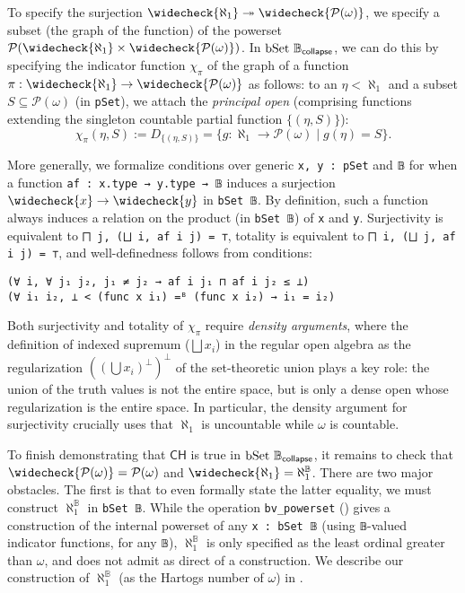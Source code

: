 \documentclass[sigplan,10pt,review]{acmart}
\newcommand{\lil}{\lstinline}
\newcommand{\CH}{\mathsf{CH}}
\theoremstyle{definition}
\begin{document}
To specify the surjection \(\widecheck{\aleph_1} \twoheadrightarrow \widecheck{\mathcal{P}(\omega)}\), we specify a subset (the graph of the function) of the powerset \(\mathcal{P}(\widecheck{\aleph_1} \times \widecheck{\mathcal{P}(\omega)})\).
In \(\text{\lil{bSet}}\ \mathbb{B}_{\mathsf{collapse}}\), we can do this by specifying the indicator function \(\chi_{\pi}\) of the graph of a function \(\pi : \widecheck{\aleph_1} \to \widecheck{\mathcal{P}(\omega)}\) as follows: to an \(\eta < \aleph_1\) and a subset \(S \subseteq \mathcal{P}(\omega)\) (in \lil{pSet}), we attach the \emph{principal open} (comprising functions extending the singleton countable partial function \(\{(\eta, S)\}\)):
\[
  \chi_\pi (\eta, S) := D_{\{(\eta, S)\}} = \{g : \aleph_1 \to \mathcal{P}(\omega) \operatorname{|} g (\eta) = S\}.
\]

More generally, we formalize conditions over generic \lil{x, y : pSet} and \lil{𝔹} for when a function \lil{af : x.type → y.type → 𝔹} induces a surjection \(\widecheck{x} \to \widecheck{y}\) in \lil{bSet 𝔹}.
By definition, such a function always induces a relation on the product (in \lil{bSet 𝔹}) of \lil{x} and \lil{y}.
Surjectivity is equivalent to \lil{⨅ j, (⨆ i, af i j) = ⊤}, totality is equivalent to \lil{⨅ i, (⨆ j, af i j) = ⊤}, and well-definedness follows from conditions:
\begin{lstlisting}
(∀ i, ∀ j₁ j₂, j₁ ≠ j₂ → af i j₁ ⊓ af i j₂ ≤ ⊥)
(∀ i₁ i₂, ⊥ < (func x i₁) =ᴮ (func x i₂) → i₁ = i₂)
\end{lstlisting}
Both surjectivity and totality of \(\chi_{\pi}\) require \emph{density arguments}, where the definition of indexed supremum (\(\bigsqcup x_i\)) in the regular open algebra as the regularization \(((\bigcup x_i)^\perp)^\perp\) of the set-theoretic union plays a key role: the union of the truth values is not the entire space, but is only a dense open whose regularization is the entire space. In particular, the density argument for surjectivity crucially uses that \(\aleph_1\) is uncountable while \(\omega\) is countable.

To finish demonstrating that \(\CH\) is true in \(\text{\lil{bSet}}\ \mathbb{B}_{\mathsf{collapse}}\), it remains to check that \(\widecheck{\mathcal{P}(\omega)} = \mathcal{P}(\omega)\) and \(\widecheck{\aleph_1} = \aleph_1^{\mathbb{B}}\).
There are two major obstacles. The first is that to even formally state the latter equality, we must construct \(\aleph_1^{\mathbb{B}}\) in \lil{bSet 𝔹}.
While the operation \lil{bv_powerset} () gives a construction of the internal powerset of any \lil{x : bSet 𝔹} (using \lil{𝔹}-valued indicator functions, for any \lil{𝔹}), \(\aleph_1^{\mathbb{B}}\) is only specified as the least ordinal greater than \(\omega\), and does not admit as direct of a construction.
We describe our construction of \(\aleph_1^{\mathbb{B}}\) (as the Hartogs number of \(\omega\)) in .
\end{document}
